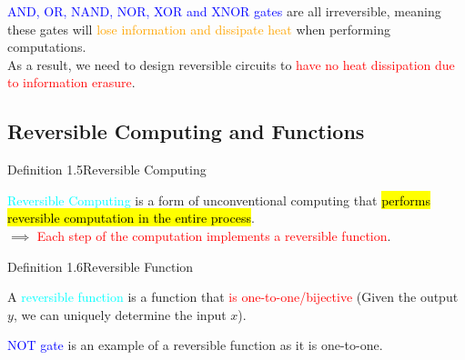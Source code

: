 \documentclass{book}
\begin{document}
\textcolor{blue}{AND, OR, NAND, NOR, XOR and XNOR gates} are all irreversible, meaning these gates will \textcolor{orange}{lose information and dissipate heat} when performing computations.\\
As a result, we need to design reversible circuits to \textcolor{red}{have no heat dissipation due to information erasure}.
\subsection{Reversible Computing and Functions}
\begin{defBox}{Definition 1.5}{Reversible Computing}
    \raggedright
    \textcolor{cyan}{Reversible Computing} is a form of unconventional computing that \hl{performs reversible computation in the entire process}.\\
    $\implies$ \textcolor{red}{Each step of the computation implements a reversible function}.
\end{defBox}
\begin{defBox}{Definition 1.6}{Reversible Function}
    \raggedright
    A \textcolor{cyan}{reversible function} is a function that \textcolor{red}{is one-to-one/bijective} (Given the output $y$, we can uniquely determine the input $x$).
\end{defBox}
\textcolor{blue}{NOT gate} is an example of a reversible function as it is one-to-one.\\
\newpage
\end{document}
